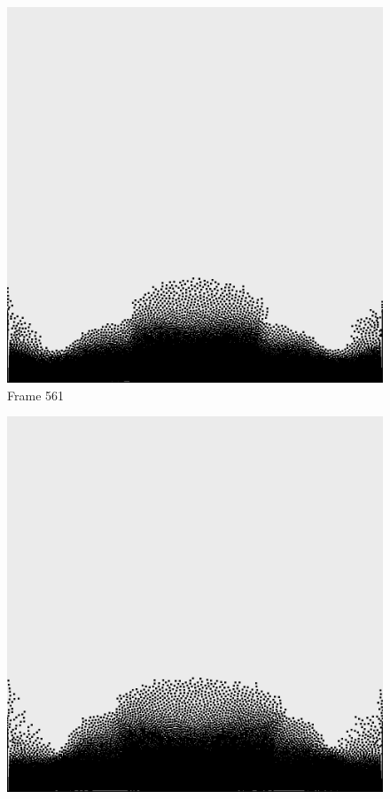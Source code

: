 \documentclass[a4paper, 12pt, oneside]{book}
\begin{document}
\begin{figure}[!ht]
    \addvspace{0.5ex}
        \begin{center}
            \includegraphics[width=\linewidth]{images/test_case_1/561.png}
            Frame 561
        \end{center}
    \endminipage
    \hfill
        \begin{center}
            \includegraphics[width=\linewidth]{images/test_case_1/581.png}

\end{center}
\end{figure}
\end{document}
